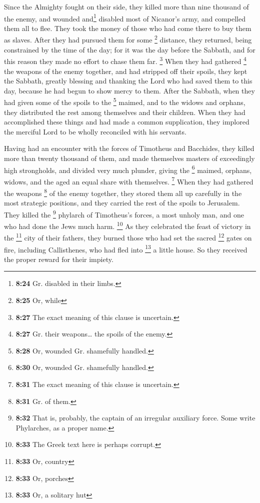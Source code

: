  Since the Almighty fought on their side, they killed
more than nine thousand of the enemy, and wounded and\footnote{\textbf{8:24}
  Gr. disabled in their limbs.} disabled most of Nicanor's army, and
compelled them all to flee.  They took the money of those
who had come there to buy them as slaves. After they had pursued them
for some \footnote{\textbf{8:25} Or, while} distance, they returned,
being constrained by the time of the day;  for it was the
day before the Sabbath, and for this reason they made no effort to chase
them far.  \footnote{\textbf{8:27} The exact meaning of
  this clause is uncertain.} When they had gathered \footnote{\textbf{8:27}
  Gr. their weapons\ldots{} the spoils of the enemy.} the weapons of the
enemy together, and had stripped off their spoils, they kept the
Sabbath, greatly blessing and thanking the Lord who had saved them to
this day, because he had begun to show mercy to them. 
After the Sabbath, when they had given some of the spoils to the
\footnote{\textbf{8:28} Or, wounded Gr. shamefully handled.} maimed, and
to the widows and orphans, they distributed the rest among themselves
and their children.  When they had accomplished these
things and had made a common supplication, they implored the merciful
Lord to be wholly reconciled with his servants.

 Having had an encounter with the forces of Timotheus and
Bacchides, they killed more than twenty thousand of them, and made
themselves masters of exceedingly high strongholds, and divided very
much plunder, giving the \footnote{\textbf{8:30} Or, wounded Gr.
  shamefully handled.} maimed, orphans, widows, and the aged an equal
share with themselves.  \footnote{\textbf{8:31} The exact
  meaning of this clause is uncertain.} When they had gathered the
weapons \footnote{\textbf{8:31} Gr. of them.} of the enemy together,
they stored them all up carefully in the most strategic positions, and
they carried the rest of the spoils to Jerusalem.  They
killed the \footnote{\textbf{8:32} That is, probably, the captain of an
  irregular auxiliary force. Some write Phylarches, as a proper name.}
phylarch of Timotheus's forces, a most unholy man, and one who had done
the Jews much harm.  \footnote{\textbf{8:33} The Greek
  text here is perhaps corrupt.} As they celebrated the feast of victory
in the \footnote{\textbf{8:33} Or, country} city of their fathers, they
burned those who had set the sacred \footnote{\textbf{8:33} Or, porches}
gates on fire, including Callisthenes, who had fled into \footnote{\textbf{8:33}
  Or, a solitary hut} a little house. So they received the proper reward
for their impiety.

